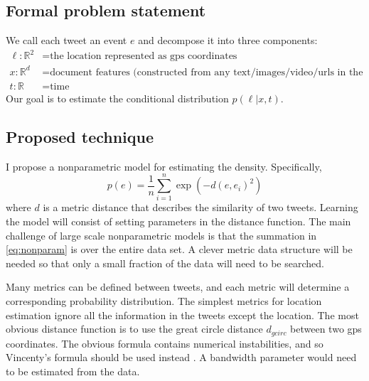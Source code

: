 \documentclass{article}
\newcommand{\R}{\mathbb{R}}
\newcommand{\dist}{d}
\newcommand{\gmap}{_{\textit{gmap}}}
\newcommand{\gcirc}{_\textit{gcirc}}
\newcommand{\prob}[1]{p\!\left({#1}\right)}
\newcommand{\cprob}[2]{\prob{{#1} | {#2}}}
\begin{document}
{\subsection {Formal problem statement}

We call each tweet an event $e$ and decompose it into three components: 
\begin{align*}
    \ell : \R^2 &= \text{the location represented as gps coordinates} \\
    x    : \R^d &= \text{document features (constructed from any text/images/video/urls in the tweet)} \\
    t    : \R~ &= \text{time}
\end{align*}
Our goal is to estimate the conditional distribution $\cprob{\ell}{x,t}$.


\subsection {Proposed technique}

I propose a nonparametric model for estimating the density.
Specifically, 
\begin{equation}
    \label{eq:nonparam}
    \prob{e} = \frac 1 n \sum_{i=1}^n \exp(-\dist(e,e_i)^2)
\end{equation}
where $\dist$ is a metric distance that describes the similarity of two tweets.
Learning the model will consist of setting parameters in the distance function.
The main challenge of large scale nonparametric models is that the summation in \eqref{eq:nonparam} is over the entire data set.
A clever metric data structure will be needed so that only a small fraction of the data will need to be searched.

Many metrics can be defined between tweets,
and each metric will determine a corresponding probability distribution.
The simplest metrics for location estimation ignore all the information in the tweets except the location.
The most obvious distance function is to use the great circle distance $\dist\gcirc$ between two gps coordinates.
The obvious formula contains numerical instabilities,
and so Vincenty's formula should be used instead \citep{vincenty1975direct}.
A bandwidth parameter would need to be estimated from the data.

}
\end{document}

